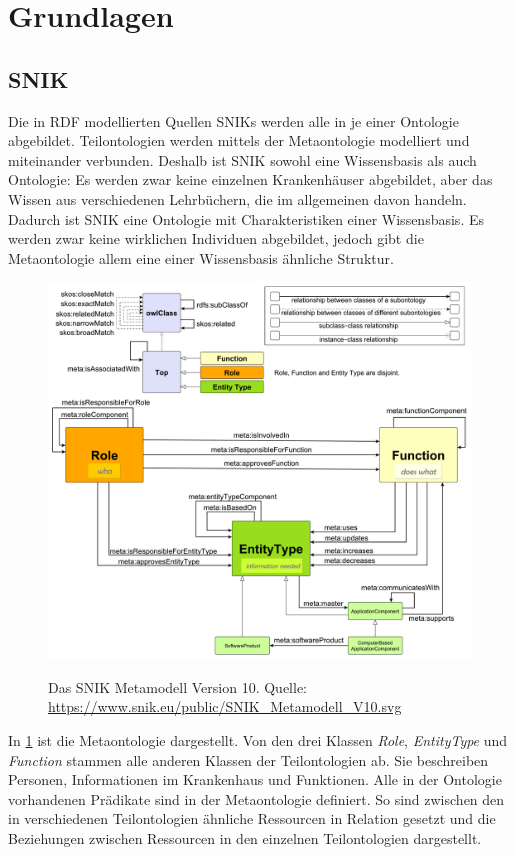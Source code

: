 \documentclass[utf8,biblatex]{lni}
\begin{document}
\section{Grundlagen}

\subsection{SNIK}

Die in RDF modellierten Quellen SNIKs werden alle in je einer Ontologie abgebildet.
Teilontologien werden mittels der Metaontologie modelliert und miteinander verbunden.
Deshalb ist SNIK sowohl eine Wissensbasis als auch Ontologie:
Es werden zwar keine einzelnen Krankenhäuser abgebildet, aber das Wissen aus verschiedenen Lehrbüchern, die im allgemeinen davon handeln.
Dadurch ist SNIK eine Ontologie mit Charakteristiken einer Wissensbasis.
Es werden zwar keine wirklichen Individuen abgebildet, jedoch gibt die Metaontologie allem eine einer Wissensbasis ähnliche Struktur.

\begin{figure}[h]
  \includegraphics[width=\linewidth]{../Dokumentation/Images/snik-metamodel-V10.pdf}\label{fig:snik-metamodel}
  \caption[SNIK Metamodell Version 10]{Das SNIK Metamodell Version 10. Quelle: \url{https://www.snik.eu/public/SNIK_Metamodell_V10.svg}}
\end{figure}
In \cref{fig:snik-metamodel} ist die Metaontologie dargestellt.
Von den drei Klassen \emph{Role}, \emph{EntityType} und \emph{Function} stammen alle anderen Klassen der Teilontologien ab.
Sie beschreiben Personen, Informationen im Krankenhaus und Funktionen.
Alle in der Ontologie vorhandenen Prädikate sind in der Metaontologie definiert.
So sind zwischen den in verschiedenen Teilontologien ähnliche Ressourcen in Relation gesetzt und die Beziehungen zwischen Ressourcen in den einzelnen Teilontologien dargestellt.
\end{document}
